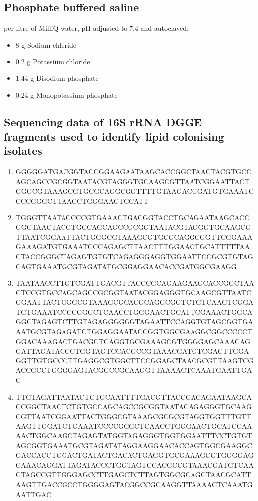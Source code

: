 \documentclass{article}
\begin{document}
\subsection{Phosphate buffered saline}
per litre of MilliQ water, pH adjusted to 7.4 and autoclaved:
\begin{itemize}
\item 8 g Sodium chloride
\item 0.2 g Potassium chloride
\item 1.44 g Disodium phosphate
\item 0.24 g Monopotassium phosphate
\end{itemize}

\subsection{Sequencing data of 16S rRNA DGGE fragments used to identify lipid colonising isolates}
\begin{enumerate}
\item GGGGGATGACGGTACCGGAAGAATAAGCACCGGCTAACTACGTGCCAGCAGCCGCGGTAATACGTAGGGTGCAAGCGTTAATCGGAATTACTGGGCGTAAAGCGTGCGCAGGCGGTTTTGTAAGACGGATGTGAAATCCCCGGGCTTAACCTGGGAACTGCATT
\item TGGGTTAATACCCCGTGAAACTGACGGTACCTGCAGAATAAGCACCGGCTAACTACGTGCCAGCAGCCGCGGTAATACGTAGGGTGCAAGCGTTAATCGGAATTACTGGGCGTAAAGCGTGCGCAGGCGGTTCGGAAAGAAAGATGTGAAATCCCAGAGCTTAACTTTGGAACTGCATTTTTAACTACCGGGCTAGAGTGTGTCAGAGGGAGGTGGAATTCCGCGTGTAGCAGTGAAATGCGTAGATATGCGGAGGAACACCGATGGCGAAGG
\item TAATAACCTTGTCGATTGACGTTACCCGCAGAAGAAGCACCGGCTAACTCCGTGCCAGCAGCCGCGGTAATACGGAGGGTGCAAGCGTTAATCGGAATTACTGGGCGTAAAGCGCACGCAGGCGGTCTGTCAAGTCGGATGTGAAATCCCCGGGCTCAACCTGGGAACTGCATTCGAAACTGGCAGGCTAGAGTCTTGTAGAGGGGGGTAGAATTCCAGGTGTAGCGGTGAAATGCGTAGAGATCTGGAGGAATACCGGTGGCGAAGGCGGCCCCCTGGACAAAGACTGACGCTCAGGTGCGAAAGCGTGGGGAGCAAACAGGATTAGATACCCTGGTAGTCCACGCCGTAAACGATGTCGACTTGGAGGTTGTGCCCTTGAGGCGTGGCTTCCGGAGCTAACGCGTTAAGTCGACCGCCTGGGGAGTACGGCCGCAAGGTTAAAACTCAAATGAATTGAC
\item TTGTAGATTAATACTCTGCAATTTTGACGTTACCGACAGAATAAGCACCGGCTAACTCTGTGCCAGCAGCCGCGGTAATACAGAGGGTGCAAGCGTTAATCGGAATTACTGGGCGTAAAGCGCGCGTAGGTGGTTTGTTAAGTTGGATGTGAAATCCCCGGGCTCAACCTGGGAACTGCATCCAAAACTGGCAAGCTAGAGTATGGTAGAGGGTGGTGGAATTTCCTGTGTAGCGGTGAAATGCGTAGATATAGGAAGGAACACCAGTGGCGAAGGCGACCACCTGGACTGATACTGACACTGAGGTGCGAAAGCGTGGGGAGCAAACAGGATTAGATACCCTGGTAGTCCACGCCGTAAACGATGTCAACTAGCCGTTGGGAGCCTTGAGCTCTTAGTGGCGCAGCTAACGCATTAAGTTGACCGCCTGGGGAGTACGGCCGCAAGGTTAAAACTCAAATGAATTGAC
\end{enumerate}
\end{document}
